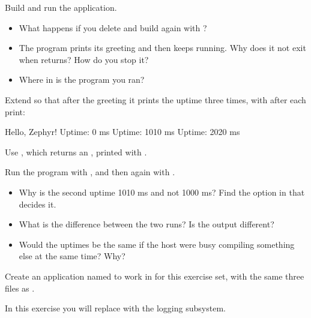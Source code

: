 Build and run the application.

\begin{itemize}
  \item What happens if you delete  and build again with ?
  \item The program prints its greeting and then keeps running. Why does it not exit when 
    returns? How do you stop it?
  \item Where in  is the program you ran?
\end{itemize}

\label{c1:ex:1.2}

Extend  so that after the greeting it prints the uptime three times, with
 after each print:

\begin{console}
Hello, Zephyr!
Uptime: 0 ms
Uptime: 1010 ms
Uptime: 2020 ms
\end{console}

Use , which returns an , printed with .

Run the program with , and then again with
.

\begin{itemize}
  \item Why is the second uptime 1010 ms and not 1000 ms? Find the option in 
    that decides it.
  \item What is the difference between the two runs? Is the output different?
  \item Would the uptimes be the same if the host were busy compiling something else at the same time? Why?
\end{itemize}

\label{c1:set:2}
Create an application named  to work in for this exercise set, with the same three
files as .

\label{c1:ex:2.1}
In this exercise you will replace  with the logging subsystem.

